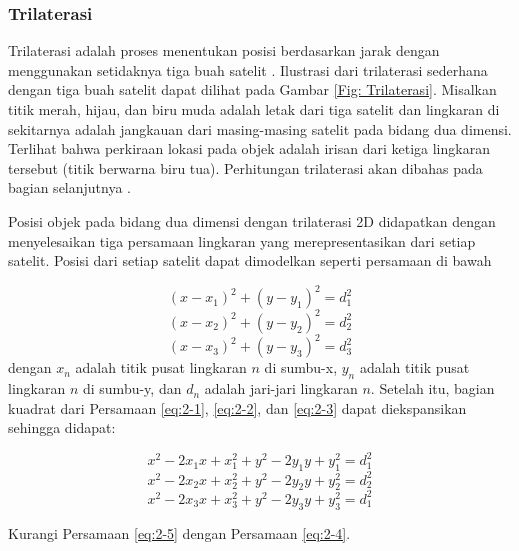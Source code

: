 \subsubsection{Trilaterasi}
Trilaterasi adalah proses menentukan posisi berdasarkan jarak dengan menggunakan setidaknya tiga buah satelit \cite{AmericanSocietyofCivilEngineers1994}. Ilustrasi dari trilaterasi sederhana dengan tiga buah satelit dapat dilihat pada Gambar \ref{Fig: Trilaterasi}. Misalkan titik merah, hijau, dan biru muda adalah letak dari tiga satelit dan lingkaran di sekitarnya adalah jangkauan dari masing-masing satelit pada bidang dua dimensi. Terlihat bahwa perkiraan lokasi pada objek adalah irisan dari ketiga lingkaran tersebut (titik berwarna biru tua). Perhitungan trilaterasi akan dibahas pada bagian selanjutnya \cite{Seo2012}.

Posisi objek pada bidang dua dimensi dengan trilaterasi 2D didapatkan dengan menyelesaikan tiga persamaan lingkaran yang merepresentasikan dari setiap satelit. Posisi dari setiap satelit dapat dimodelkan seperti persamaan di bawah

\begin{equation}
	\left(x-x_1\right)^2 + \left(y-y_1\right)^2=d_1^2
	\label{eq:2-1}
\end{equation}
\begin{equation}
	\left(x-x_2\right)^2 + \left(y-y_2\right)^2=d_2^2
	\label{eq:2-2}
\end{equation}
\begin{equation}
	\left(x-x_3\right)^2 + \left(y-y_3\right)^2=d_3^2
	\label{eq:2-3}
\end{equation}
dengan $x_n$ adalah titik pusat lingkaran $n$ di sumbu-x, $y_n$ adalah titik pusat lingkaran $n$ di sumbu-y, dan $d_n$ adalah jari-jari lingkaran $n$. Setelah itu, bagian kuadrat dari Persamaan \ref{eq:2-1}, \ref{eq:2-2}, dan \ref{eq:2-3} dapat diekspansikan sehingga didapat:

\begin{equation}
	x^2-2x_1x+x_1^2+y^2-2y_1y+y_1^2=d_1^2
	\label{eq:2-4}
\end{equation}
\begin{equation}
	x^2-2x_2x+x_2^2+y^2-2y_2y+y_2^2=d_2^2
	\label{eq:2-5}
\end{equation}
\begin{equation}
	x^2-2x_3x+x_3^2+y^2-2y_3y+y_3^2=d_1^2
	\label{eq:2-6}
\end{equation}

Kurangi Persamaan \ref{eq:2-5} dengan  Persamaan \ref{eq:2-4}.

